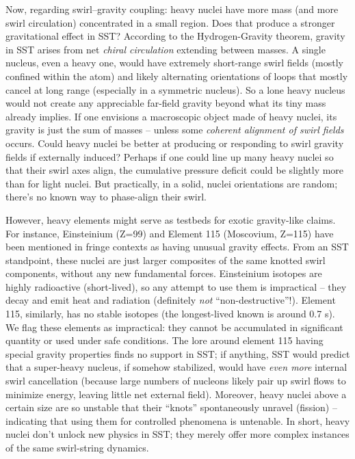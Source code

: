 \documentclass[11pt]{article}
\begin{document}
Now, regarding swirl–gravity coupling: heavy nuclei have more mass (and more swirl circulation) concentrated in a small region. Does that produce a stronger gravitational effect in SST? According to the Hydrogen-Gravity theorem, gravity in SST arises from net \textit{chiral circulation} extending between masses. A single nucleus, even a heavy one, would have extremely short-range swirl fields (mostly confined within the atom) and likely alternating orientations of loops that mostly cancel at long range (especially in a symmetric nucleus). So a lone heavy nucleus would not create any appreciable far-field gravity beyond what its tiny mass already implies. If one envisions a macroscopic object made of heavy nuclei, its gravity is just the sum of masses – unless some \textit{coherent alignment of swirl fields} occurs. Could heavy nuclei be better at producing or responding to swirl gravity fields if externally induced? Perhaps if one could line up many heavy nuclei so that their swirl axes align, the cumulative pressure deficit could be slightly more than for light nuclei. But practically, in a solid, nuclei orientations are random; there’s no known way to phase-align their swirl.


However, heavy elements might serve as testbeds for exotic gravity-like claims. For instance, Einsteinium (Z=99) and Element 115 (Moscovium, Z=115) have been mentioned in fringe contexts as having unusual gravity effects. From an SST standpoint, these nuclei are just larger composites of the same knotted swirl components, without any new fundamental forces. Einsteinium isotopes are highly radioactive (short-lived), so any attempt to use them is impractical – they decay and emit heat and radiation (definitely \textit{not} “non-destructive”!). Element 115, similarly, has no stable isotopes (the longest-lived known is around 0.7 s). We flag these elements as impractical: they cannot be accumulated in significant quantity or used under safe conditions. The lore around element 115 having special gravity properties finds no support in SST; if anything, SST would predict that a super-heavy nucleus, if somehow stabilized, would have \textit{even more} internal swirl cancellation (because large numbers of nucleons likely pair up swirl flows to minimize energy, leaving little net external field). Moreover, heavy nuclei above a certain size are so unstable that their “knots” spontaneously unravel (fission) – indicating that using them for controlled phenomena is untenable. In short, heavy nuclei don’t unlock new physics in SST; they merely offer more complex instances of the same swirl-string dynamics.
\end{document}
